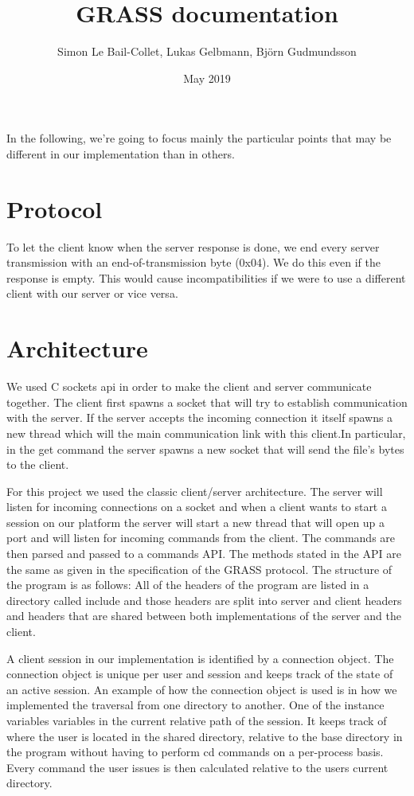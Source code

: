 \documentclass{article}
\title{GRASS documentation}
\author{Simon Le Bail-Collet, Lukas Gelbmann, Björn Gudmundsson}
\date{May 2019}
\begin{document}
\maketitle

In the following, we're going to focus mainly the particular points that may be different in our implementation than in others.

\section{Protocol}

To let the client know when the server response is done, we end every server transmission with an end-of-transmission byte (0x04).
We do this even if the response is empty.
This would cause incompatibilities if we were to use a different client with our server or vice versa.

\section{Architecture}
We used C sockets api in order to make the client and server communicate together. The client first spawns a socket that will try to establish communication with the server. If the server accepts the incoming connection it itself spawns a new thread which will the main communication link with this client.In particular, in the get command the server spawns a new socket that will send the file's bytes to the client.

For this project we used the classic client/server architecture. The server will listen for incoming connections on a socket and when a client wants to start
a session on our platform the server will start a new thread that will open up a port and will listen for incoming commands from the client. The commands are then parsed
and passed to a commands API. The methods stated in the API are the same as given in the specification of the GRASS protocol. The structure of the program is as follows: All of the
headers of the program are listed in a directory called include and those headers are split into server and client headers and headers that are shared between both
implementations of the server and the client.

A client session in our implementation is identified by a connection object. The connection object is unique per user and session and keeps track of the state of
an active session. An example of how the connection object is used is in how we implemented the traversal from one directory to another. One of the instance variables
variables in the current relative path of the session. It keeps track of where the user is located in the shared directory, relative to the base directory in the program without having to perform
cd commands on a per-process basis. Every command the user issues is then calculated relative to the users current directory.
\end{document}
